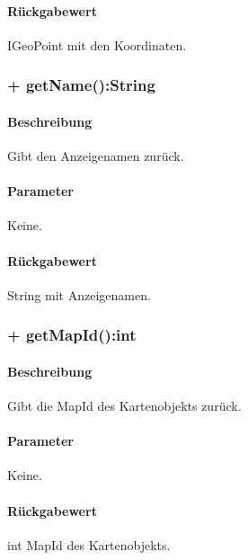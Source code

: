 \paragraph*{Rückgabewert}
IGeoPoint mit den Koordinaten.

\subsubsection{+ getName():String}%
\paragraph*{Beschreibung}
Gibt den Anzeigenamen zurück.
\paragraph*{Parameter}
Keine.
\paragraph*{Rückgabewert}
String mit Anzeigenamen.

\subsubsection{+ getMapId():int}%
\paragraph*{Beschreibung}
Gibt die MapId des Kartenobjekts zurück.
\paragraph*{Parameter}
Keine.
\paragraph*{Rückgabewert}
int MapId des Kartenobjekts.